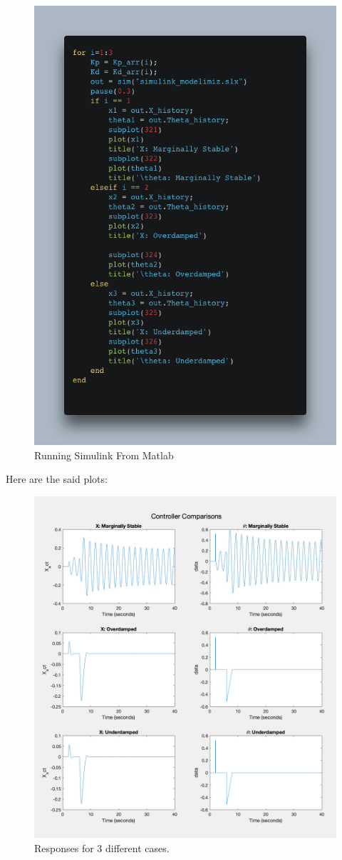 \begin{figure}[H]
    \centering
    \includegraphics[width=.7\textwidth]{images/carbon-2.png}
    \caption{Running Simulink From Matlab}
    \label{fig:simmat}
\end{figure}


Here are the said plots:

\begin{figure}[H]
    \centering
    \includegraphics[width=.7\textwidth]{images/responses_first.png}
    \caption{Responses for 3 different cases.}
    \label{fig:mat}
\end{figure}


